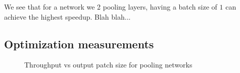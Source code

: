 \documentclass[conference]{./IEEEtran/IEEEtran}
\begin{document}
  We see that for a network we 2 pooling layers, having a batch
  size of $1$ can achieve the highest speedup.  Blah blah...


\subsection{Optimization measurements}




  \begin{figure}[!htbp]
    \centering %

    \caption{Throughput vs output patch size for pooling networks
    }
    \label{fig:experiments1}
  \end{figure}
\end{document}

